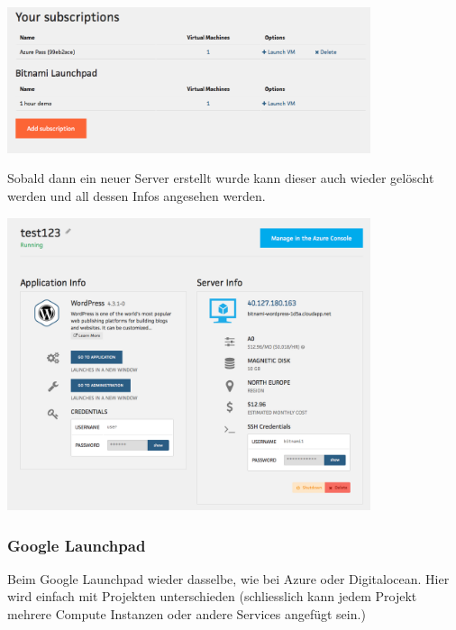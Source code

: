 \documentclass[11pt]{scrartcl}
\begin{document}
\includegraphics[width=0.8\textwidth]{azure_subscriptions}


Sobald dann ein neuer Server erstellt wurde kann dieser auch wieder gelöscht 
werden und all dessen Infos angesehen werden.

\includegraphics[width=0.8\textwidth]{azure_instanceinfos}

\subsubsection{Google Launchpad}

Beim Google Launchpad wieder dasselbe, wie bei Azure oder Digitalocean.
Hier wird einfach mit Projekten unterschieden (schliesslich kann jedem Projekt mehrere Compute Instanzen 
oder andere Services angefügt sein.)
\end{document}
